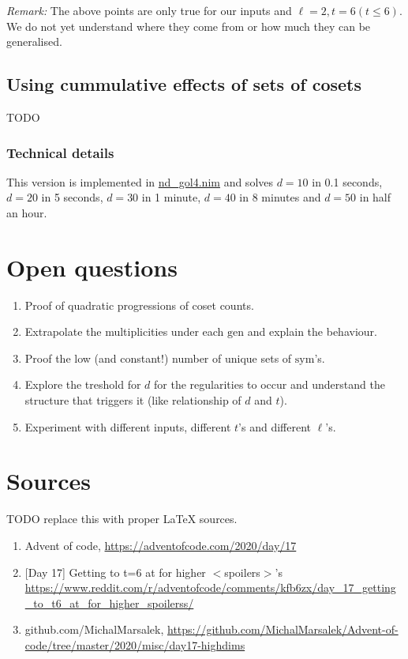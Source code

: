 \documentclass[]{article}
\newcommand{\sym}{\mathrm{sym}}
\newcommand{\gen}{\mathrm{gen}}
\begin{document}
	\emph{Remark:} The above points are only true for our inputs and $\ell=2, t=6 (t \leq 6)$. We do not yet understand where they come from or how much they can be generalised.
	
	\newpage
	
	\subsection{Using cummulative effects of sets of cosets}
	TODO
	
	\subsubsection{Technical details}
	
	This version is implemented in \href{https://github.com/MichalMarsalek/Advent-of-code/blob/master/2020/misc/day17-highdims/nd_gol3.nim}{nd\_gol4.nim} and solves $d=10$ in 0.1 seconds, $d=20$ in 5 seconds, $d=30$ in 1 minute, $d=40$ in 8 minutes and $d=50$ in half an hour.
	
	\section{Open questions}
	\begin{enumerate}
		\item Proof of quadratic progressions of coset counts.
		\item Extrapolate the multiplicities under each $\gen$ and explain the behaviour.
		\item Proof the low (and constant!) number of unique sets of $\sym$'s.
		\item Explore the treshold for $d$ for the regularities to occur and understand the structure that triggers it (like relationship of $d$ and $t$).
		\item Experiment with different inputs, different $t$'s and different $\ell$'s.
	\end{enumerate}
	
	
	\newpage
	\section{Sources}
	TODO replace this with proper \LaTeX $ $ $ $sources.
	
	\begin{enumerate}
		\item Advent of code, \url{https://adventofcode.com/2020/day/17}
		\item {}[Day 17] Getting to t=6 at for higher $<$spoilers$>$'s \url{https://www.reddit.com/r/adventofcode/comments/kfb6zx/day_17_getting_to_t6_at_for_higher_spoilerss/}
		\item github.com/MichalMarsalek, \url{https://github.com/MichalMarsalek/Advent-of-code/tree/master/2020/misc/day17-highdims}
	\end{enumerate}
\end{document}
